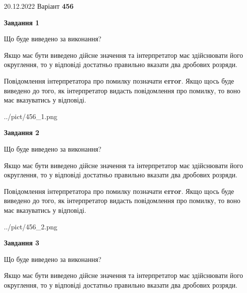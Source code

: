 \documentclass[12pt, ukrainian]{article}
\begin{document}
{20.12.2022 Варіант \No \textbf { 456 }\par}
{
\begin {Large}

{\begin {center}\textbf{Завдання 1}\end {center}}\par
Що буде виведено за виконання? \par

Якщо має бути виведено дійсне значення та інтерпретатор має здійснювати його округлення, 
то у відповіді достатньо правильно вказати два дробових розряди.

Повідомлення інтерпретатора про помилку позначати \textbf{error}.
Якщо щось буде виведено до того, як інтерпретатор видасть повідомлення про помилку, 
то воно має вказуватись у відповіді. \par

\begin{center}
	{../pict/456_1.png}
\end{center}
\newpage

{\begin {center}\textbf{Завдання 2}\end {center}}\par
Що буде виведено за виконання? \par

Якщо має бути виведено дійсне значення та інтерпретатор має здійснювати його округлення, 
то у відповіді достатньо правильно вказати два дробових розряди.

Повідомлення інтерпретатора про помилку позначати \textbf{error}.
Якщо щось буде виведено до того, як інтерпретатор видасть повідомлення про помилку, 
то воно має вказуватись у відповіді. \par

\begin{center}
	{../pict/456_2.png}
\end{center}
\newpage

{\begin {center}\textbf{Завдання 3}\end {center}}\par
Що буде виведено за виконання? \par

Якщо має бути виведено дійсне значення та інтерпретатор має здійснювати його округлення, 
то у відповіді достатньо правильно вказати два дробових розряди.


\end{Large}}
\end{document}
